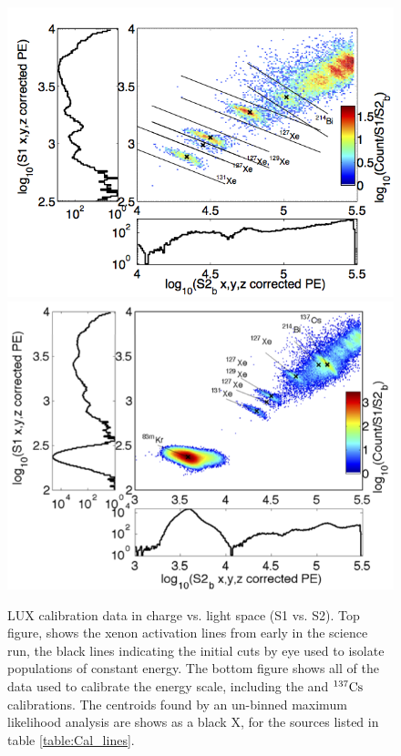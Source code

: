 \renewcommand{\baselinestretch}{1}
\small\normalsize
\begin{figure}[h!]\centering
\includegraphics[width=120mm]{Chapter_E_Scale/Figures/Doke_new/S1S2_density_XeA_fit.png}
\includegraphics[width=120mm]{Chapter_E_Scale/Figures/Doke_new/S1S2_density_Kr_Cs_fit.png}
\caption{LUX calibration data in charge vs. light space (S1 vs. S2). Top figure, shows the xenon activation lines from early in the science run, the black lines indicating the initial cuts by eye used to isolate populations of constant energy. The bottom figure shows all of the data used to calibrate the energy scale, including the \KrCal and $\rm ^{137}Cs$ calibrations. The centroids found by an un-binned maximum likelihood analysis are shows as a black X, for the sources listed in table \ref{table:Cal_lines}. }
\label{fig:S1S2_space}
\end{figure}
\renewcommand{\baselinestretch}{2}
\small\normalsize

